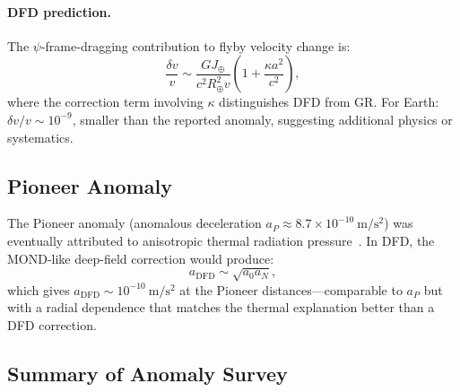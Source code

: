 \documentclass[aps,prd,twocolumn,showpacs,preprintnumbers,superscriptaddress,nofootinbib]{revtex4-2}
\begin{document}
\paragraph{DFD prediction.}
The $\psi$-frame-dragging contribution to flyby velocity change is:
\begin{equation}
\frac{\delta v}{v} \sim \frac{GJ_\oplus}{c^2 R_\oplus^2 v}
  \left(1 + \frac{\kappa a^2}{c^2}\right),
\end{equation}
where the correction term involving $\kappa$ distinguishes DFD from GR.
For Earth: $\delta v/v \sim 10^{-9}$, smaller than the reported anomaly,
suggesting additional physics or systematics.

\subsection{Pioneer Anomaly~\cite{Anderson2002}}\label{sec:pioneer}

The Pioneer anomaly (anomalous deceleration $a_P \approx 8.7\times 10^{-10}~\mathrm{m/s^2}$)
was eventually attributed to anisotropic thermal radiation
pressure~\cite{Turyshev2012}.  In DFD, the MOND-like deep-field
correction would produce:
\begin{equation}
a_{\mathrm{DFD}} \sim \sqrt{a_0 a_N},
\end{equation}
which gives $a_{\mathrm{DFD}} \sim 10^{-10}~\mathrm{m/s^2}$ at the
Pioneer distances---comparable to $a_P$ but with a radial dependence
that matches the thermal explanation better than a DFD correction.

\subsection{Summary of Anomaly Survey}\label{sec:anomaly-summary}
\end{document}
